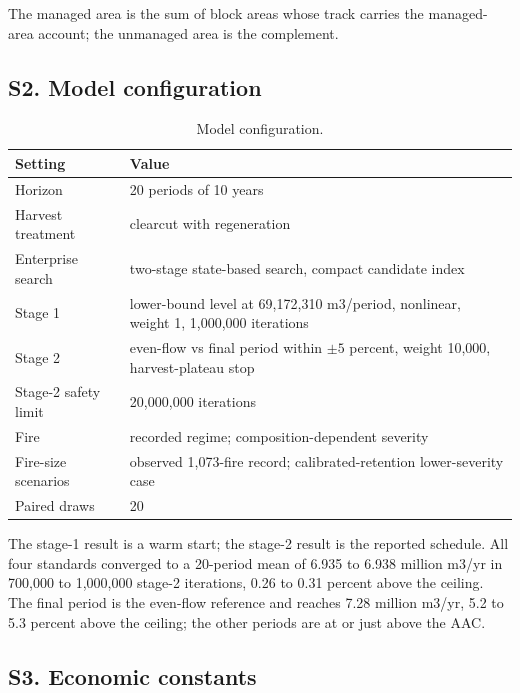 The managed area is the sum of block areas whose track carries the managed-area account; the
unmanaged area is the complement.

\subsection*{S2. Model configuration}

\begin{table}[h]
    \centering
    \small
    \caption{Model configuration.}
    \label{tab:supp_settings}
    \begin{tabular}{ll}
        \toprule
        Setting & Value \\
        \midrule
        Horizon                     & 20 periods of 10 years \\
        Harvest treatment           & clearcut with regeneration \\
        Enterprise search           & two-stage state-based search, compact candidate index \\
        Stage 1                      & lower-bound level at 69,172,310 m3/period, nonlinear, weight 1, 1,000,000 iterations \\
        Stage 2                      & even-flow vs final period within $\pm 5$ percent, weight 10,000, harvest-plateau stop \\
        Stage-2 safety limit         & 20,000,000 iterations \\
        Fire                        & recorded regime; composition-dependent severity \\
        Fire-size scenarios          & observed 1,073-fire record; calibrated-retention lower-severity case \\
        Paired draws                 & 20 \\
        \bottomrule
    \end{tabular}
\end{table}

The stage-1 result is a warm start; the stage-2 result is the reported schedule. All four standards
converged to a 20-period mean of 6.935 to 6.938 million m3/yr in 700,000 to 1,000,000 stage-2
iterations, 0.26 to 0.31 percent above the ceiling. The final period is the even-flow reference and
reaches 7.28 million m3/yr, 5.2 to 5.3 percent above the ceiling; the other periods are at or just
above the AAC.

\subsection*{S3. Economic constants}

